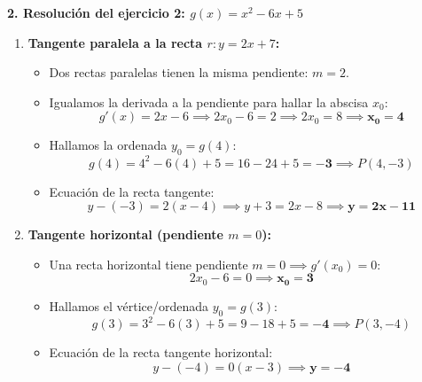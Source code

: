 ﻿\documentclass[11pt,a4paper]{article}
\begin{document}
\vspace{0.4cm}
\noindent\textbf{2. Resolución del ejercicio 2: $g(x) = x^2 - 6x + 5$}

\begin{enumerate}[label=\textbf{\alph*)}, leftmargin=2em, itemsep=6pt]
    \item \textbf{Tangente paralela a la recta $r: y = 2x + 7$:}
    \begin{itemize}[leftmargin=1.5em, itemsep=2pt]
        \item Dos rectas paralelas tienen la misma pendiente: $m = 2$.
        \item Igualamos la derivada a la pendiente para hallar la abscisa $x_0$:
        \[
        g'(x) = 2x - 6 \implies 2x_0 - 6 = 2 \implies 2x_0 = 8 \implies \mathbf{x_0 = 4}
        \]
        \item Hallamos la ordenada $y_0 = g(4)$:
        \[
        g(4) = 4^2 - 6(4) + 5 = 16 - 24 + 5 = \mathbf{-3} \implies P(4, -3)
        \]
        \item Ecuación de la recta tangente:
        \[
        y - (-3) = 2(x - 4) \implies y + 3 = 2x - 8 \implies \mathbf{y = 2x - 11}
        \]
    \end{itemize}

    \item \textbf{Tangente horizontal (pendiente $m = 0$):}
    \begin{itemize}[leftmargin=1.5em, itemsep=2pt]
        \item Una recta horizontal tiene pendiente $m = 0 \implies g'(x_0) = 0$:
        \[
        2x_0 - 6 = 0 \implies \mathbf{x_0 = 3}
        \]
        \item Hallamos el vértice/ordenada $y_0 = g(3)$:
        \[
        g(3) = 3^2 - 6(3) + 5 = 9 - 18 + 5 = \mathbf{-4} \implies P(3, -4)
        \]
        \item Ecuación de la recta tangente horizontal:
        \[
        y - (-4) = 0(x - 3) \implies \mathbf{y = -4}
        \]
    \end{itemize}
\end{enumerate}
\end{document}
